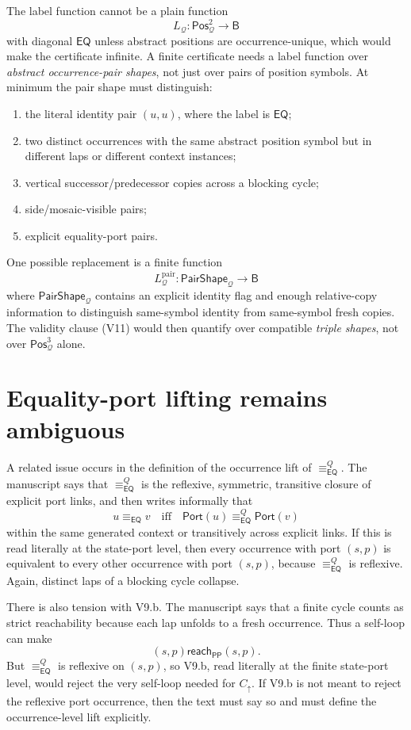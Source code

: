 \documentclass[11pt]{article}
\newcommand{\EQ}{\mathsf{EQ}}
\newcommand{\PP}{\mathsf{PP}}
\newcommand{\Base}{\mathsf{B}}
\newcommand{\Q}{\mathcal Q}
\newcommand{\Pos}{\mathsf{Pos}}
\newcommand{\reach}{\mathrel{\mathsf{reach}}}
\newcommand{\eqc}{\equiv_{\EQ}}
\newcommand{\Port}{\mathsf{Port}}
\begin{document}
The label function cannot be a plain function
\[
  L_{\Q}:\Pos_{\Q}^{2}\to\Base
\]
with diagonal $\EQ$ unless abstract positions are occurrence-unique, which would
make the certificate infinite.  A finite certificate needs a label function over
\emph{abstract occurrence-pair shapes}, not just over pairs of position symbols.
At minimum the pair shape must distinguish:
\begin{enumerate}[leftmargin=2em,label=(D\arabic*)]
  \item the literal identity pair $(u,u)$, where the label is $\EQ$;
  \item two distinct occurrences with the same abstract position symbol but in
        different laps or different context instances;
  \item vertical successor/predecessor copies across a blocking cycle;
  \item side/mosaic-visible pairs;
  \item explicit equality-port pairs.
\end{enumerate}
One possible replacement is a finite function
\[
  L_{\Q}^{\mathrm{pair}}:\mathsf{PairShape}_{\Q}\to\Base
\]
where $\mathsf{PairShape}_{\Q}$ contains an explicit identity flag and enough
relative-copy information to distinguish same-symbol identity from same-symbol
fresh copies.  The validity clause (V11) would then quantify over compatible
\emph{triple shapes}, not over $\Pos_{\Q}^{3}$ alone.

\section{Equality-port lifting remains ambiguous}
\label{sec:eqports}

A related issue occurs in the definition of the occurrence lift of
$\eqc^{Q}$.  The manuscript says that $\eqc^{Q}$ is the reflexive, symmetric,
transitive closure of explicit port links, and then writes informally that
\[
  u\eqc v \quad\text{iff}\quad \Port(u)\eqc^{Q}\Port(v)
\]
within the same generated context or transitively across explicit links.
If this is read literally at the state-port level, then every occurrence with
port $(s,p)$ is equivalent to every other occurrence with port $(s,p)$, because
$\eqc^{Q}$ is reflexive.  Again, distinct laps of a blocking cycle collapse.

There is also tension with V9.b.  The manuscript says that a finite cycle counts
as strict reachability because each lap unfolds to a fresh occurrence.  Thus a
self-loop can make
\[
  (s,p)\reach_{\PP}(s,p).
\]
But $\eqc^{Q}$ is reflexive on $(s,p)$, so V9.b, read literally at the finite
state-port level, would reject the very self-loop needed for
$C_{\uparrow}$.  If V9.b is not meant to reject the reflexive port occurrence,
then the text must say so and must define the occurrence-level lift explicitly.
\end{document}
